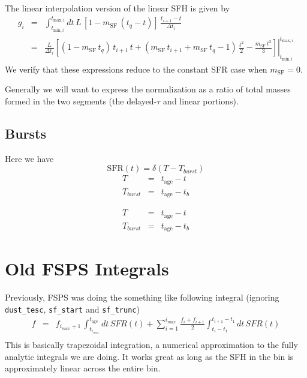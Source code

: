 \documentclass[12pt, letterpaper, preprint]{aastex}
\newcommand{\tmin}[1][]{t_{\mathrm{min} #1}}
\newcommand{\tmax}[1][]{t_{\mathrm{max} #1}}
\newcommand{\dt}{\Delta t_i}
\newcommand{\tintegral}{\int_{\tmin[,i]}^{\tmax[,i]} dt}
\newcommand{\tinterval}{\right|_{\tmin[,i]}^{\tmax[,i]}}
\newcommand{\tage}{t_{\mathrm{age}}}
\newcommand{\sfslope}{m_{\mathrm{SF}}}
\begin{document}
The linear interpolation version of the linear SFH is given by 
\begin{eqnarray}
g_i  & = & \tintegral \,  L\, \left[1 - \sfslope \, (t_q - t)\right] \, \frac{t_{i+1} - t}{\dt}  \nonumber \\
      & = & \frac{L}{\dt} \left.\left[(1-\sfslope\, t_q) \, t_{i+1} \, t + \left(\sfslope\, t_{i+1} + \sfslope \, t_q -1\right)\, \frac{t^2}{2} - \frac{\sfslope\, t^3}{3}\right] \tinterval
\end{eqnarray}
We verify that these expressions reduce to the constant SFR case when $\sfslope=0$.

Generally we will want to express the normalization as a ratio of total masses formed in the two segments (the delayed-$\tau$ and linear portions).

\subsection{Bursts}

Here we have 
\[ 
\mathrm{SFR}(t) = \delta(T - T_{burst})
\]
\begin{eqnarray}
T & = & \tage - t \nonumber \\
T_{burst} & = & \tage - t_b
\end{eqnarray}

\begin{eqnarray}
T & = & \tage - t \nonumber \\
T_{burst} & = & \tage - t_b
\end{eqnarray}


\section{Old FSPS Integrals}

Previously, FSPS was doing the something like following integral (ignoring \texttt{dust\_tesc}, \texttt{sf\_start} and \texttt{sf\_trunc})
\begin{eqnarray}
f & = & f_{i_{max}+1} \, \int _{t_{i_{max}}}^{\tage} dt\, SFR(t) + \sum_{i=1}^{i_{max}} \frac{f_i + f_{i+1}}{2}\int _{t_{i}-t_1}^{t_{i+1}-t_1} dt\, SFR(t) \\
\end{eqnarray}
This is basically trapezoidal integration, a numerical approximation to the fully analytic integrals we are doing.  
It works great as long as the SFH in the bin is approximately linear across the entire bin.
\end{document}
